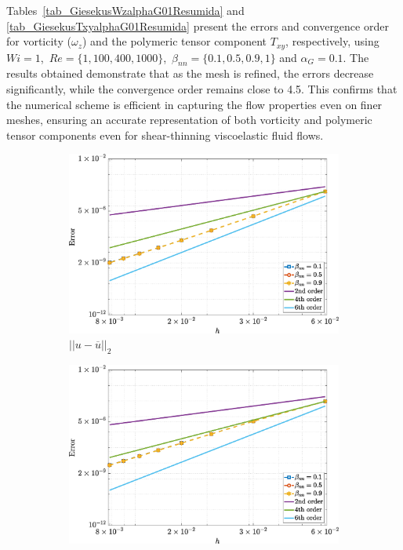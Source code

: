 \documentclass[preprint, 12pt]{elsarticle}
\begin{document}
Tables~\ref{tab_GiesekusWzalphaG01Resumida} and \ref{tab_GiesekusTxyalphaG01Resumida} present the errors and convergence order for vorticity ($\omega_z$) and the polymeric tensor component $T_{xy}$, respectively, using $Wi = 1$,~$Re=\{1,100,400,1000\}$,~$\beta_{nn}=\{0.1,0.5,0.9,1\}$ and $\alpha_G = 0.1$. The results obtained demonstrate that as the mesh is refined, the errors decrease significantly, while the convergence order remains close to 4.5. This confirms that the numerical scheme is efficient in capturing the flow properties even on finer meshes, ensuring an accurate representation of both vorticity and polymeric tensor components even for shear-thinning viscoelastic fluid flows.

\begin{figure}[H]
    \centering  
    \begin{subfigure}[b]{.46\textwidth}
        \includegraphics[width=\textwidth]{NormErr_2nd_Re_100_Wi_1_epsilon_0_xi_0_alphaG_0.5_Dt_1e-06_at_0.05_tipsim_1_MMS_12_U.eps}
        \caption{$||u - \overline{u}||_{2}$}
        \label{error_u_2nd_Case1_giesekus_alphaG_0.5}
    \end{subfigure}
    \vspace{0.2cm}
    \qquad
    \begin{subfigure}[b]{.46\textwidth}
        \includegraphics[width=\textwidth]{NormErr_2nd_Re_100_Wi_1_epsilon_0_xi_0_alphaG_0.5_Dt_1e-06_at_0.05_tipsim_1_MMS_12_V.eps}

\end{subfigure}
\end{figure}
\end{document}
